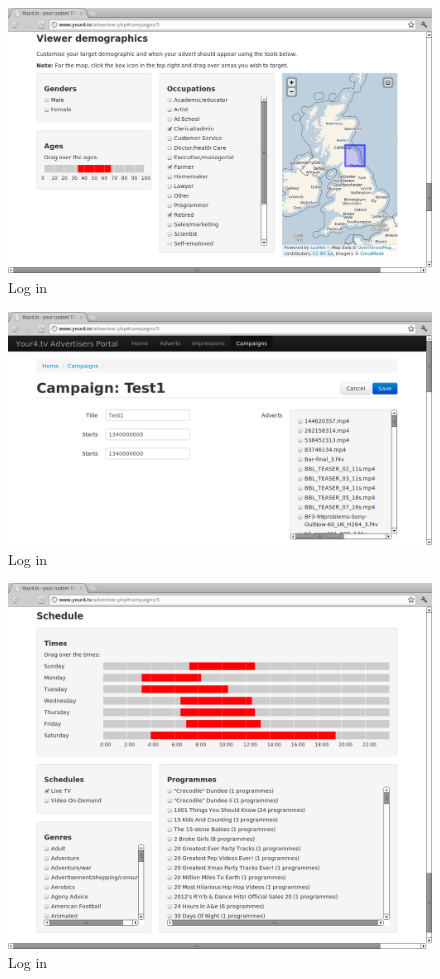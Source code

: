 \begin{figure}[th]
	\centering
	\includegraphics[width=\textwidth]{images/screenshots/advertiser-campaign-demographics.png}
	\caption{Log in}
	\label{fig:advertiser-campaign-demographics}
\end{figure}
\begin{figure}[th]
	\centering
	\includegraphics[width=\textwidth]{images/screenshots/advertiser-campaign.png}
	\caption{Log in}
	\label{fig:advertiser-campaign}
\end{figure}
\begin{figure}[th]
	\centering
	\includegraphics[width=\textwidth]{images/screenshots/advertiser-campaign-schedule.png}
	\caption{Log in}
	\label{fig:advertiser-campaign-schedule}
\end{figure}